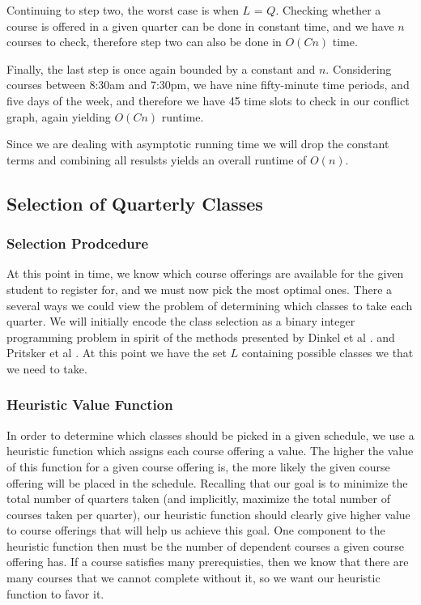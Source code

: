 \documentclass[11pt]{article} %
\begin{document}
Continuing to step two, the worst case is when $L$ = $Q$. Checking whether a course is offered in a given quarter can be done in constant time, and we have $n$ courses to check, therefore step two can also be done in $O(Cn)$ time.

Finally, the last step is once again bounded by a constant and $n$. Considering courses between 8:30am and 7:30pm, we have nine fifty-minute time periods, and five days of the week, and therefore we have 45 time slots to check in our conflict graph, again yielding $O(Cn)$ runtime.

Since we are dealing with asymptotic running time we will drop the constant terms and combining all resulsts yields an overall runtime of $O(n)$.

\subsection{Selection of Quarterly Classes}
\subsubsection{Selection Prodcedure}
At this point in time, we know which course offerings are available for the given student to register for, and we must now pick the most optimal ones. There a several ways we could view the problem of determining which classes to take each quarter. We will initially encode the class selection as a binary integer programming problem in spirit of the methods presented by Dinkel et al \cite{dinel:scheduling}. and Pritsker et al \cite{prisker:informs}. At this point we have the set $L$ containing possible classes we that we need to take.

\subsubsection{Heuristic Value Function}
In order to determine which classes should be picked in a given schedule, we use a heuristic function which assigns each course 
offering a value. The higher the value of this function for a given course offering is, the more likely the given course offering 
will be placed in the schedule. Recalling that our goal is to minimize the total number of quarters taken (and implicitly, 
maximize the total number of courses taken per quarter), our heuristic function should clearly give higher value to course 
offerings that will help us achieve this goal. One component to the heuristic function then must be the number of dependent 
courses a given course offering has. If a course satisfies many prerequisties, then we know that there are many courses that 
we cannot complete without it, so we want our heuristic function to favor it. 
\end{document}
